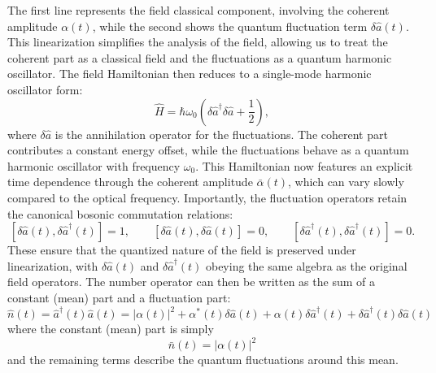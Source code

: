 The first line represents the field classical component, involving the coherent amplitude $\alpha(t)$, while the second shows the quantum fluctuation term $\delta\hat{a}(t)$. This linearization simplifies the analysis of the field, allowing us to treat the coherent part as a classical field and the fluctuations as a quantum harmonic oscillator. The field Hamiltonian then reduces to a single-mode harmonic oscillator form:
\begin{equation}
\hat{H} = \hbar \omega_0 \left( \delta \hat{a}^\dagger \delta \hat{a} + \frac{1}{2} \right),
\end{equation}
where $\delta \hat{a}$ is the annihilation operator for the fluctuations. The coherent part contributes a constant energy offset, while the fluctuations behave as a quantum harmonic oscillator with frequency $\omega_0$. This Hamiltonian now features an explicit time dependence through the coherent amplitude $\bar{\alpha}(t)$, which can vary slowly compared to the optical frequency.
Importantly, the fluctuation operators retain the canonical bosonic commutation relations:
\[
[\delta \hat{a}(t), \delta \hat{a}^\dagger(t)] = 1, \qquad
[\delta \hat{a}(t), \delta \hat{a}(t)] = 0, \qquad
[\delta \hat{a}^\dagger(t), \delta \hat{a}^\dagger(t)] = 0.
\]
These ensure that the quantized nature of the field is preserved under linearization, with $\delta \hat{a}(t)$ and $\delta \hat{a}^\dagger(t)$ obeying the same algebra as the original field operators. The number operator can then be written as the sum of a constant (mean) part and a fluctuation part:
\begin{equation}
\hat{n}(t) = \hat{a}^\dagger(t)\hat{a}(t) = |\alpha(t)|^2 + \alpha^*(t)\delta\hat{a}(t) + \alpha(t)\delta\hat{a}^\dagger(t) + \delta\hat{a}^\dagger(t)\delta\hat{a}(t)
\end{equation}
where the constant (mean) part is simply
\begin{equation}
\bar{n}(t) = |\alpha(t)|^2
\end{equation}
and the remaining terms describe the quantum fluctuations around this mean. \\

